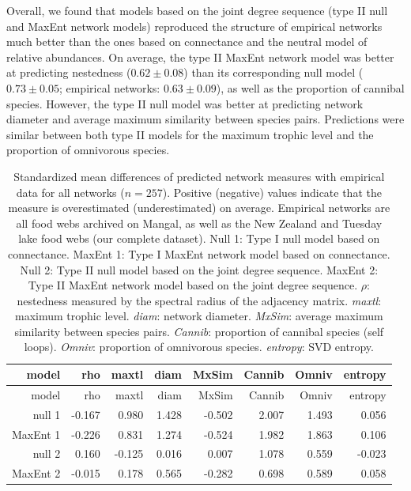 \documentclass[10pt,oneside]{article}
\begin{document}
Overall, we found that models based on the joint degree sequence (type
II null and MaxEnt network models) reproduced the structure of empirical
networks much better than the ones based on connectance and the neutral
model of relative abundances. On average, the type II MaxEnt network
model was better at predicting nestedness (\(0.62 \pm 0.08\)) than its
corresponding null model (\(0.73 \pm 0.05\); empirical networks:
\(0.63 \pm 0.09\)), as well as the proportion of cannibal species.
However, the type II null model was better at predicting network
diameter and average maximum similarity between species pairs.
Predictions were similar between both type II models for the maximum
trophic level and the proportion of omnivorous species.

\hypertarget{tbl:measures_all}{}
\begin{longtable}[]{@{}rrrrrrrr@{}}
\caption{\label{tbl:measures_all}Standardized mean differences of
predicted network measures with empirical data for all networks
(\(n = 257\)). Positive (negative) values indicate that the measure is
overestimated (underestimated) on average. Empirical networks are all
food webs archived on Mangal, as well as the New Zealand and Tuesday
lake food webs (our complete dataset). Null 1: Type I null model based
on connectance. MaxEnt 1: Type I MaxEnt network model based on
connectance. Null 2: Type II null model based on the joint degree
sequence. MaxEnt 2: Type II MaxEnt network model based on the joint
degree sequence. \(\rho\): nestedness measured by the spectral radius of
the adjacency matrix. \emph{maxtl}: maximum trophic level. \emph{diam}:
network diameter. \emph{MxSim}: average maximum similarity between
species pairs. \emph{Cannib}: proportion of cannibal species (self
loops). \emph{Omniv}: proportion of omnivorous species. \emph{entropy}:
SVD entropy.}\tabularnewline
\toprule
model & rho & maxtl & diam & MxSim & Cannib & Omniv &
entropy\tabularnewline
\midrule
\endfirsthead
\toprule
model & rho & maxtl & diam & MxSim & Cannib & Omniv &
entropy\tabularnewline
\midrule
\endhead
null 1 & -0.167 & 0.980 & 1.428 & -0.502 & 2.007 & 1.493 &
0.056\tabularnewline
MaxEnt 1 & -0.226 & 0.831 & 1.274 & -0.524 & 1.982 & 1.863 &
0.106\tabularnewline
null 2 & 0.160 & -0.125 & 0.016 & 0.007 & 1.078 & 0.559 &
-0.023\tabularnewline
MaxEnt 2 & -0.015 & 0.178 & 0.565 & -0.282 & 0.698 & 0.589 &
0.058\tabularnewline
\bottomrule
\end{longtable}
\end{document}
